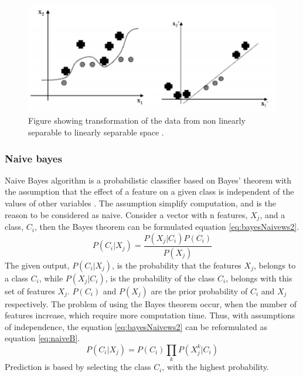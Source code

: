 \documentclass[USenglish]{ifimaster}  %
\begin{document}
\begin{figure}[h]
	\centering
	\includegraphics{Figures/svmtransform}
	\caption{Figure showing transformation of the data from non linearly separable to linearly separable space \cite{Marsland:2009:MLA:1571643}.}
	\label{fig:svmtransform}
\end{figure}
\FloatBarrier
	
\subsubsection{Naive bayes}
Naive Bayes algorithm is a probabilistic classifier based on Bayes’ theorem with the assumption that the effect of a feature on a given class is independent of the values of other variables \cite{Marsland:2009:MLA:1571643}. The assumption simplify computation, and is the reason to be considered as naive. Consider a vector with n features, $X_j$, and a class, $C_i$, then the Bayes theorem can be formulated equation \ref{eq:bayesNaivews2}.
\begin{equation} 
P(C_i \vert X_j) = \frac{P(X_j \vert C_i)P(C_i)}{P(X_j)}
\label{eq:bayesNaivews2}
\end{equation}
The given output, $P(C_i \vert X_j)$, is the probability that the features $X_j$, belongs to a class $C_i$, while $P(X_j \vert C_i)$, is the probability of the class $C_i$, belongs with this set of features $X_j$.  $P(C_i)$ and $P(X_j)$ are the prior probability of $C_i$ and  $X_j$ respectively. The problem of using the Bayes theorem occur, when the number of features increase, which require more computation time. Thus, with assumptions of independence, the equation \ref{eq:bayesNaivews2} can be reformulated as equation \ref{eq:naiveB}.
\begin{equation} 
P(C_i \vert X_j)  = P(C_i)\prod_{k}P(X_{j}^{k} \vert C_i)
\label{eq:naiveB}
\end{equation}
Prediction is based by selecting the class $C_i$, with the highest probability. 
\end{document}
